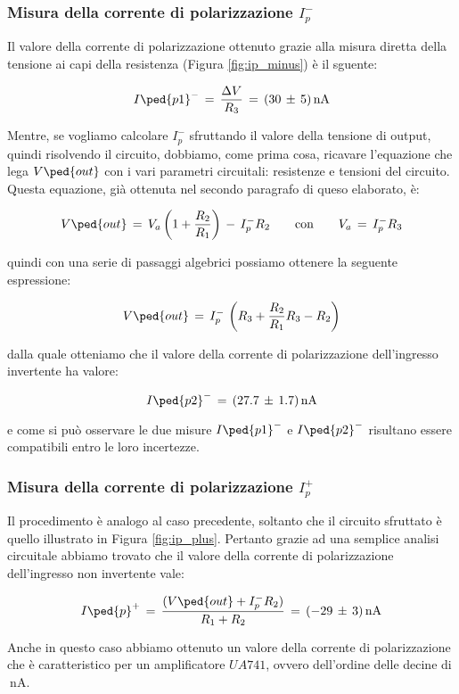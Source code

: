 \subsubsection*{Misura della corrente di polarizzazione $I_{p}^-$}

Il valore della corrente di polarizzazione ottenuto grazie alla misura diretta della tensione ai capi della resistenza (Figura \ref{fig:ip_minus}) è il sguente:

\begin{equation}
	I\ped{p1}^-\,=\,\frac{\Delta V}{R_3}\,=\,(30\,\pm\,5)\,\SI{}{\nano\ampere}
\end{equation}

Mentre, se vogliamo calcolare $I_{p}^-$ sfruttando il valore della tensione di output, quindi risolvendo il circuito, dobbiamo, come prima cosa, ricavare l'equazione che lega $V\ped{out}$ con i vari parametri circuitali: resistenze e tensioni del circuito. Questa equazione, già ottenuta nel secondo paragrafo di queso elaborato, è:

\begin{equation}
	V\ped{out}\,=\,V_a\left(1+\frac{R_2}{R_1}\right)\,-\,I_{p}^-R_2 \qquad \text{con} \qquad V_a\,=\,I_{p}^-R_3
\end{equation}

quindi con una serie di passaggi algebrici possiamo ottenere la seguente espressione:

\begin{equation}
	V\ped{out}\,=\,I_{p}^-\,\left(R_3+\frac{R_2}{R_1}R_3-R_2\right)
\end{equation}

dalla quale otteniamo che il valore della corrente di polarizzazione dell'ingresso invertente ha valore:

\begin{equation}
	I\ped{p2}^-\,=\,(27.7\,\pm\,1.7)\,\SI{}{\nano\ampere}
\end{equation}

e come si può osservare le due misure $I\ped{p1}^-$ e $I\ped{p2}^-$ risultano essere compatibili entro le loro incertezze.

\subsubsection*{Misura della corrente di polarizzazione $I_{p}^+$}

Il procedimento è analogo al caso precedente, soltanto che il circuito sfruttato è quello illustrato in Figura \ref{fig:ip_plus}. Pertanto grazie ad una semplice analisi circuitale abbiamo trovato che il valore della corrente di polarizzazione dell'ingresso non invertente vale:

\begin{equation}
	I\ped{p}^+\,=\,\frac{(V\ped{out}+I_p^-R_2)}{R_1+R_2}\,=\,(-29\,\pm\,3)\,\SI{}{\nano\ampere}
\end{equation}

Anche in questo caso abbiamo ottenuto un valore della corrente di polarizzazione che è caratteristico per un amplificatore $UA741$, ovvero dell'ordine delle decine di $\SI{}{\nano\ampere}$.